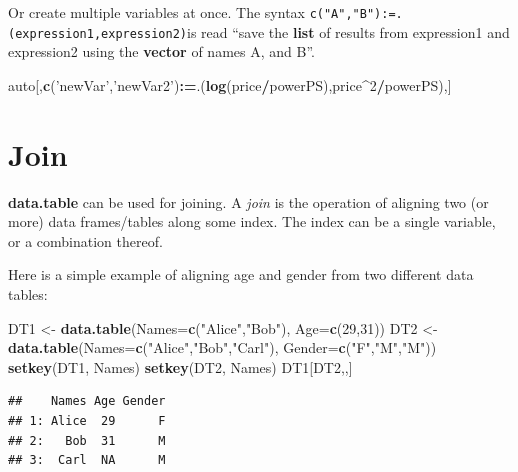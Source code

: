 \documentclass[]{book}
\newenvironment{Shaded}{\begin{snugshade}}{\end{snugshade}}
\newcommand{\DataTypeTok}[1]{\textcolor[rgb]{0.13,0.29,0.53}{#1}}
\newcommand{\DecValTok}[1]{\textcolor[rgb]{0.00,0.00,0.81}{#1}}
\newcommand{\ErrorTok}[1]{\textcolor[rgb]{0.64,0.00,0.00}{\textbf{#1}}}
\newcommand{\KeywordTok}[1]{\textcolor[rgb]{0.13,0.29,0.53}{\textbf{#1}}}
\newcommand{\NormalTok}[1]{#1}
\newcommand{\OperatorTok}[1]{\textcolor[rgb]{0.81,0.36,0.00}{\textbf{#1}}}
\newcommand{\StringTok}[1]{\textcolor[rgb]{0.31,0.60,0.02}{#1}}
\theoremstyle{definition}
\theoremstyle{definition}
\theoremstyle{definition}
\theoremstyle{remark}
\begin{document}
Or create multiple variables at once.
The syntax \texttt{c("A","B"):=.(expression1,expression2)}is read ``save the \textbf{list} of results from expression1 and expression2 using the \textbf{vector} of names A, and B''.

\begin{Shaded}
\begin{Highlighting}[]
\NormalTok{auto[,}\KeywordTok{c}\NormalTok{(}\StringTok{'newVar'}\NormalTok{,}\StringTok{'newVar2'}\NormalTok{)}\OperatorTok{:}\ErrorTok{=}\NormalTok{.(}\KeywordTok{log}\NormalTok{(price}\OperatorTok{/}\NormalTok{powerPS),price}\OperatorTok{^}\DecValTok{2}\OperatorTok{/}\NormalTok{powerPS),]}
\end{Highlighting}
\end{Shaded}

\hypertarget{join}{%
\section{Join}\label{join}}

\textbf{data.table} can be used for joining.
A \emph{join} is the operation of aligning two (or more) data frames/tables along some index.
The index can be a single variable, or a combination thereof.

Here is a simple example of aligning age and gender from two different data tables:

\begin{Shaded}
\begin{Highlighting}[]
\NormalTok{DT1 <-}\StringTok{ }\KeywordTok{data.table}\NormalTok{(}\DataTypeTok{Names=}\KeywordTok{c}\NormalTok{(}\StringTok{"Alice"}\NormalTok{,}\StringTok{"Bob"}\NormalTok{), }\DataTypeTok{Age=}\KeywordTok{c}\NormalTok{(}\DecValTok{29}\NormalTok{,}\DecValTok{31}\NormalTok{))}
\NormalTok{DT2 <-}\StringTok{ }\KeywordTok{data.table}\NormalTok{(}\DataTypeTok{Names=}\KeywordTok{c}\NormalTok{(}\StringTok{"Alice"}\NormalTok{,}\StringTok{"Bob"}\NormalTok{,}\StringTok{"Carl"}\NormalTok{), }\DataTypeTok{Gender=}\KeywordTok{c}\NormalTok{(}\StringTok{"F"}\NormalTok{,}\StringTok{"M"}\NormalTok{,}\StringTok{"M"}\NormalTok{))}
\KeywordTok{setkey}\NormalTok{(DT1, Names)}
\KeywordTok{setkey}\NormalTok{(DT2, Names)}
\NormalTok{DT1[DT2,,] }
\end{Highlighting}
\end{Shaded}

\begin{verbatim}
##    Names Age Gender
## 1: Alice  29      F
## 2:   Bob  31      M
## 3:  Carl  NA      M
\end{verbatim}
\end{document}
